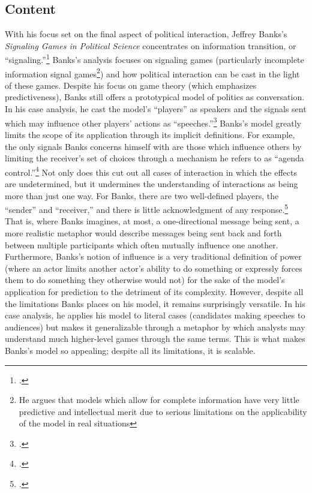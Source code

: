 \documentclass{article}
\begin{document}
\subsection{Content}
With his focus set on the final aspect of political interaction, Jeffrey Banks's \emph{Signaling Games in Political Science} concentrates on information transition, or ``signaling.''\footcite{banks91} 
Banks's analysis focuses on signaling games (particularly incomplete information signal games\footnote{He argues that models which allow for complete information have very little predictive and intellectual merit due to serious limitations on the applicability of the model in real situations}) and how political interaction can be cast in the light of these games. 
Despite his focus on game theory (which emphasizes predictiveness), Banks still offers a prototypical model of politics as conversation. 
In his case analysis, he cast the model's ``players'' as speakers and the signals sent which may influence other players' actions as ``speeches.''\footcite[37]{banks91} 
Banks's model greatly limits the scope of its application through its implicit definitions. 
For example, the only signals Banks concerns himself with are those which influence others by limiting the receiver's set of choices through a mechanism he refers to as ``agenda control.''\footcite[3]{banks91} 
Not only does this cut out all cases of interaction in which the effects are undetermined, but it undermines the understanding of interactions as being more than just one way. 
For Banks, there are two well-defined players, the ``sender'' and ``receiver,'' and there is little acknowledgment of any response.\footcite[4]{banks91} 
That is, where Banks imagines, at most, a one-directional message being sent, a more realistic metaphor would describe messages being sent back and forth between multiple participants which often mutually influence one another. 
Furthermore, Banks's notion of influence is a very traditional definition of power (where an actor limits another actor's ability to do something or expressly forces them to do something they otherwise would not) for the sake of the model's application for prediction to the detriment of its complexity. 
However, despite all the limitations Banks places on his model, it remains surprisingly versatile. 
In his case analysis, he applies his model to literal cases (candidates making speeches to audiences) but makes it generalizable through a metaphor by which analysts may understand much higher-level games through the same terms. 
This is what makes Banks's model so appealing; despite all its limitations, it is scalable.
\end{document}

